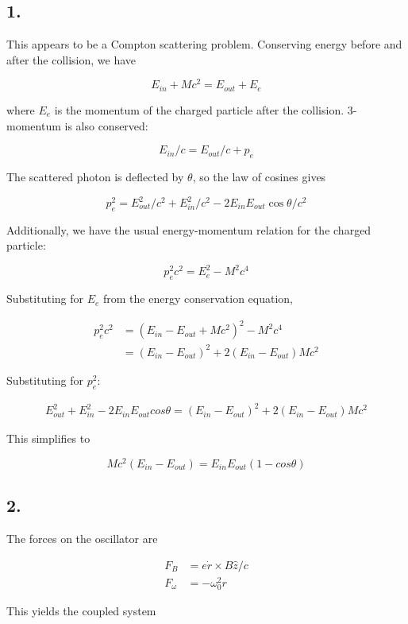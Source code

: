 \documentclass[12pt]{article}
\begin{document}
\subsection*{1.}

This appears to be a Compton scattering problem. Conserving energy before and after the collision, we have

\[E_{in} + Mc^2 = E_{out} + E_e
\]

\noindent where \(E_{e}\) is the momentum of the charged particle after the collision. 3-momentum is also conserved:

\[E_{in}/c = E_{out}/c + p_{e}
\]

\noindent The scattered photon is deflected by \(\theta\), so the law of cosines gives

\[p_{e}^2 = E_{out}^2/c^2 + E_{in}^2/c^2 - 2E_{in}E_{out}\cos{\theta}/c^2
\]

\noindent Additionally, we have the usual energy-momentum relation for the charged particle:

\[p_{e}^2c^2 = E_{e}^2 - M^2c^4\]

\noindent Substituting for \(E_e\) from the energy conservation equation,

\begin{align*}
p_e^2c^2 &= (E_{in} - E_{out} + Mc^2)^2 - M^2c^4 \\
&= (E_{in} - E_{out})^2 + 2(E_{in} - E_{out})Mc^2
\end{align*}

\noindent Substituting for \(p_e^2\):

\begin{align*}
E_{out}^2 + E_{in}^2 - 2E_{in}E_{out}cos\theta = (E_{in} - E_{out})^2 + 2(E_{in} - E_{out})Mc^2
\end{align*}

\noindent This simplifies to

\[Mc^2(E_{in}-E_{out}) = E_{in}E_{out}(1-cos\theta)
\]
\pagebreak

\subsection*{2.}

\noindent The forces on the oscillator are 

\begin{align*}
F_B &= e\dot{r}\times B\hat{z}/c \\
F_\omega  &= -\omega_0^2r
\end{align*}

\noindent This yields the coupled system
\end{document}

